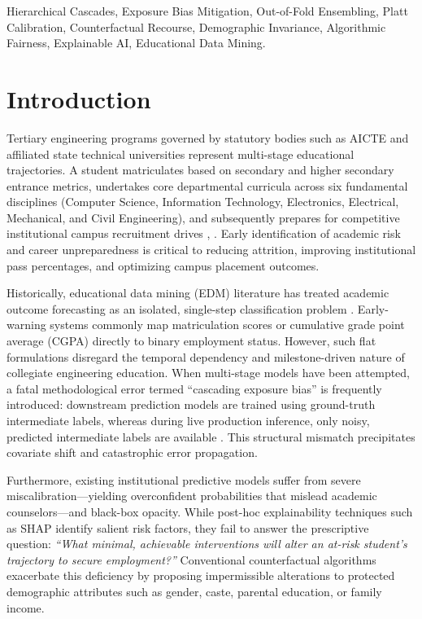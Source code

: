 \documentclass[conference]{IEEEtran}
\begin{document}
\begin{IEEEkeywords}
Hierarchical Cascades, Exposure Bias Mitigation, Out-of-Fold Ensembling, Platt Calibration, Counterfactual Recourse, Demographic Invariance, Algorithmic Fairness, Explainable AI, Educational Data Mining.
\end{IEEEkeywords}

\section{Introduction}
Tertiary engineering programs governed by statutory bodies such as AICTE and affiliated state technical universities represent multi-stage educational trajectories. A student matriculates based on secondary and higher secondary entrance metrics, undertakes core departmental curricula across six fundamental disciplines (Computer Science, Information Technology, Electronics, Electrical, Mechanical, and Civil Engineering), and subsequently prepares for competitive institutional campus recruitment drives \cite{rastrollo2020}, \cite{alam2021}. Early identification of academic risk and career unpreparedness is critical to reducing attrition, improving institutional pass percentages, and optimizing campus placement outcomes.

Historically, educational data mining (EDM) literature has treated academic outcome forecasting as an isolated, single-step classification problem \cite{srikant2017}. Early-warning systems commonly map matriculation scores or cumulative grade point average (CGPA) directly to binary employment status. However, such flat formulations disregard the temporal dependency and milestone-driven nature of collegiate engineering education. When multi-stage models have been attempted, a fatal methodological error termed ``cascading exposure bias'' is frequently introduced: downstream prediction models are trained using ground-truth intermediate labels, whereas during live production inference, only noisy, predicted intermediate labels are available \cite{bengio2015}. This structural mismatch precipitates covariate shift and catastrophic error propagation.

Furthermore, existing institutional predictive models suffer from severe miscalibration---yielding overconfident probabilities that mislead academic counselors---and black-box opacity. While post-hoc explainability techniques such as SHAP \cite{lundberg2017} identify salient risk factors, they fail to answer the prescriptive question: \textit{``What minimal, achievable interventions will alter an at-risk student's trajectory to secure employment?''} Conventional counterfactual algorithms \cite{wachter2017} exacerbate this deficiency by proposing impermissible alterations to protected demographic attributes such as gender, caste, parental education, or family income.
\end{document}
